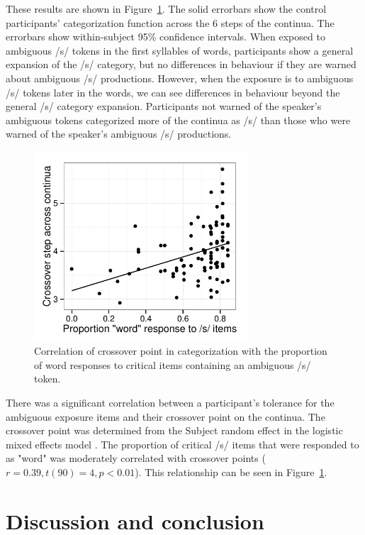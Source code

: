 \documentclass[a4paper,11pt,twocolumn]{article}
\begin{document}
These results are shown in Figure~\ref{fig:categ}.  The solid errorbars show the control participants' categorization function across the 6 steps of the continua.  The errorbars show within-subject 95\% confidence intervals.  When exposed to ambiguous /s/ tokens in the first syllables of words, participants show a general expansion of the /s/ category, but no differences in behaviour if they are warned about ambiguous /s/ productions.  However, when the exposure is to ambiguous /s/ tokens later in the words, we can see differences in behaviour beyond the general /s/ category expansion.  Participants not warned of the speaker's ambiguous tokens categorized more of the continua as /s/ than those who were warned of the speaker's ambiguous /s/ productions.

\begin{figure}[!ht]
\caption{Correlation of crossover point in categorization with the proportion of word responses to critical items containing an ambiguous /s/ token.}\label{fig:categ}
\begin{center}
\includegraphics[width=80mm]{xoverwordresp}
\end{center}
\end{figure}

There was a significant correlation between a participant's tolerance for the ambiguous exposure items and their crossover point on the continua.  The crossover point was determined from the Subject random effect in the logistic mixed effects model \cite{Kleber}. The proportion of critical /s/ items that were responded to as "word" was moderately correlated with crossover points ($r = 0.39, t (90) = 4, p < 0.01$).  This relationship can be seen in Figure~\ref{fig:categ}.

\section{Discussion and conclusion}
\end{document}
